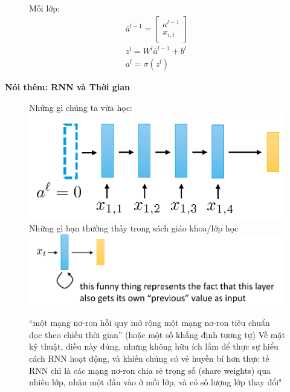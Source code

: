 \documentclass{book}
\begin{document}
\begin{figure}[H]
\begin{minipage}[c]{0.35\textwidth}
\begin{itemize}
        \end{itemize}
    \end{minipage}\hfill
        \begin{minipage}[c]{0.2\textwidth}
            Mỗi lớp:
            \begin{equation*}
                \begin{aligned}
            \bar{a}^{l-1}=\begin{bmatrix}
                a^{l-1} \\
                x_{i,t}
            \end{bmatrix} \\ z^l=W^l\bar{a}^{l-1}+b^l \\ a^l=\sigma(z^l)
        \end{aligned}
        \end{equation*}
    \end{minipage}
\end{figure}
\textbf{Nói thêm: RNN và Thời gian}
\begin{figure}[H]
    \centering
    \begin{minipage}[c]{0.45\textwidth}
        Những gì chúng ta vừa học:
        \includegraphics[width=\textwidth]{images/rnns_and_time.png}
        Những gì bạn thường thấy trong sách giáo khoa/lớp học
        \includegraphics[width=\textwidth]{images/rnns_and_time_2.png}
    \end{minipage}\hfill
    \begin{minipage}[c]{0.45\textwidth}
        “một mạng nơ-ron hồi quy mở rộng một mạng nơ-ron tiêu chuẩn dọc theo chiều thời gian”
        (hoặc một số khẳng định tương tự)
        Về mặt kỹ thuật, điều này đúng, nhưng không hữu ích lắm
        để thực sự hiểu cách RNN hoạt động, và
        khiến chúng có vẻ huyền bí hơn thực tế
        RNN chỉ là các mạng nơ-ron chia sẻ trọng số (share weights)
        qua nhiều lớp, nhận một đầu vào ở mỗi lớp,
        và có số lượng lớp thay đổi"
    \end{minipage}
\end{figure}
\end{document}
